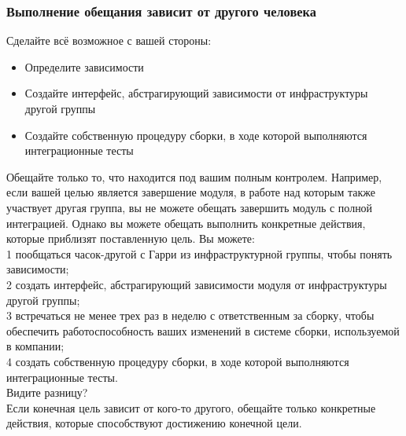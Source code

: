 \documentclass{../industrial-development}
\begin{document}
\begin{frame} \frametitle{Выполнение обещания зависит от другого человека }
Сделайте всё возможное с вашей стороны:
\begin{itemize}
	\item Определите зависимости
	\item Создайте интерфейс, абстрагирующий зависимости от инфраструктуры другой группы
	\item Создайте собственную процедуру сборки, в ходе которой выполняются интеграционные тесты
\end{itemize}
\end{frame}
\lecturenotes
Обещайте только то, что находится под вашим полным контролем. Например, если вашей целью является завершение модуля, в работе
над которым также участвует другая группа, вы не можете обещать завершить модуль с полной интеграцией. Однако вы можете обещать выполнить конкретные действия, которые приблизят поставленную цель. Вы можете:\\
1 пообщаться часок-другой с Гарри из инфраструктурной группы, чтобы понять зависимости;\\
2 создать интерфейс, абстрагирующий зависимости модуля от инфраструктуры другой группы;\\
3 встречаться не менее трех раз в неделю с ответственным за сборку, чтобы обеспечить работоспособность ваших изменений в системе сборки, используемой в компании;\\
4 создать собственную процедуру сборки, в ходе которой выполняются интеграционные тесты.\\
Видите разницу?\\
Если конечная цель зависит от кого-то другого, обещайте только конкретные действия, которые способствуют достижению конечной цели.
\end{document}
